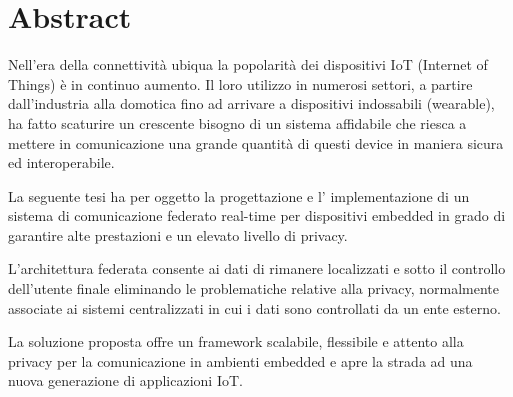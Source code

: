 \chapter*{Abstract}

Nell'era della connettività ubiqua la popolarità dei dispositivi IoT (Internet of Things) è in continuo aumento.
Il loro utilizzo in numerosi settori, a partire dall'industria alla domotica fino ad arrivare a dispositivi indossabili (wearable), ha fatto scaturire   un
crescente bisogno di un sistema affidabile che riesca a mettere in comunicazione una grande quantità di questi device in maniera sicura ed interoperabile.

La seguente tesi ha per oggetto la progettazione e l' implementazione di un sistema di comunicazione federato real-time per dispositivi 
embedded in grado di garantire alte prestazioni e un elevato livello di privacy. 

L'architettura federata consente ai dati di rimanere localizzati e sotto il controllo dell'utente finale eliminando le problematiche 
relative alla privacy, normalmente associate ai sistemi centralizzati in cui i dati sono controllati da un ente esterno.

La soluzione proposta offre un framework scalabile, flessibile e attento alla privacy per la 
comunicazione in ambienti embedded e apre la strada ad una nuova generazione di applicazioni IoT. 